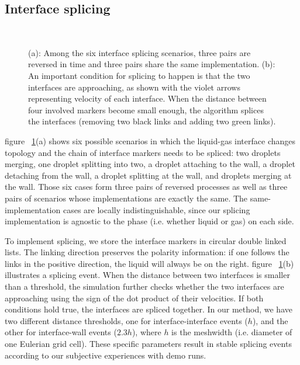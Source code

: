 \documentclass{jfm}
\begin{document}
\subsection{Interface splicing} \label{subsec:splice}
\begin{figure}
\centering
{}\quad
{}\\
\caption{\footnotesize (a): Among the six interface splicing scenarios, three pairs are reversed in time and three pairs share the same implementation. (b): An important condition for splicing to happen is that the two interfaces are approaching, as shown with the violet arrows representing velocity of each interface. When the distance between four involved markers become small enough, the algorithm splices the interfaces (removing two black links and adding two green links).}
\label{fig:splice}
\end{figure}
figure ~\ref{fig:splice}(a) shows six possible scenarios in which the liquid-gas interface changes topology and the chain of interface markers needs to be spliced: two droplets merging, one droplet splitting into two, a droplet attaching to the wall, a droplet detaching from the wall, a droplet splitting at the wall, and droplets merging at the wall. Those six cases form three pairs of reversed processes as well as three pairs of scenarios whose implementations are exactly the same. The same-implementation cases are locally indistinguishable, since our splicing implementation is agnostic to the phase (i.e. whether liquid or gas) on each side. 

To implement splicing, we store the interface markers in circular double linked lists. The linking direction preserves the polarity information: if one follows the links in the positive direction, the liquid will always be on the right. figure ~\ref{fig:splice}(b) illustrates a splicing event. When the distance between two interfaces is smaller than a threshold, the simulation further checks whether the two interfaces are approaching using the sign of the dot product of their velocities. If both conditions hold true, the interfaces are spliced together. In our method, we have two different distance thresholds, one for interface-interface events ($h$), and the other for interface-wall events ($2.3h$), where $h$ is the meshwidth (i.e. diameter of one Eulerian grid cell). These specific parameters result in stable splicing events according to our subjective experiences with demo runs. 
\end{document}
